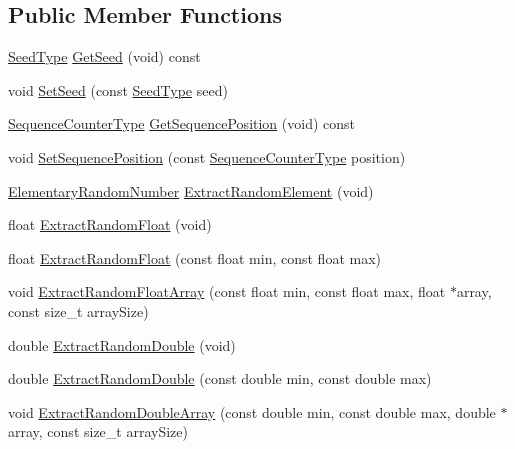 \subsection*{Public Member Functions}
\begin{DoxyCompactItemize}
\item 
\hyperlink{classcmn_random_sequence_a7b97009536ce38559fa5fb86a9eea16d}{Seed\-Type} \hyperlink{classcmn_random_sequence_a57fe316f0876245c29b59433e38b1c3f}{Get\-Seed} (void) const 
\item 
void \hyperlink{classcmn_random_sequence_a6a2a9b155aabad3f03084dd0118b7184}{Set\-Seed} (const \hyperlink{classcmn_random_sequence_a7b97009536ce38559fa5fb86a9eea16d}{Seed\-Type} seed)
\item 
\hyperlink{classcmn_random_sequence_ac3befd667513146020ef266429e205b0}{Sequence\-Counter\-Type} \hyperlink{classcmn_random_sequence_a929d0a120c7d031c0387098c2d2d6c4a}{Get\-Sequence\-Position} (void) const 
\item 
void \hyperlink{classcmn_random_sequence_aa3dacc3e54ded2e0b55e78e460f1bd0d}{Set\-Sequence\-Position} (const \hyperlink{classcmn_random_sequence_ac3befd667513146020ef266429e205b0}{Sequence\-Counter\-Type} position)
\item 
\hyperlink{classcmn_random_sequence_a4728645d25009df6b70fd0db6340f92f}{Elementary\-Random\-Number} \hyperlink{classcmn_random_sequence_ae86a1796c5a5fac599d61eb4a97e584d}{Extract\-Random\-Element} (void)
\item 
float \hyperlink{classcmn_random_sequence_a83458b2db657ac64588a2ccab6fea256}{Extract\-Random\-Float} (void)
\item 
float \hyperlink{classcmn_random_sequence_ac1c18ecbee3d9c31513167cd00b1619d}{Extract\-Random\-Float} (const float min, const float max)
\item 
void \hyperlink{classcmn_random_sequence_a0bfe5e8b2dfeb93e78eda34f3b445a55}{Extract\-Random\-Float\-Array} (const float min, const float max, float $\ast$array, const size\-\_\-t array\-Size)
\item 
double \hyperlink{classcmn_random_sequence_a86a8975706bba0f41e0d0a50327ba28d}{Extract\-Random\-Double} (void)
\item 
double \hyperlink{classcmn_random_sequence_a4a62c7f71d9bab73b58282c50ef5403d}{Extract\-Random\-Double} (const double min, const double max)
\item 
void \hyperlink{classcmn_random_sequence_a4135de38e09760cc8f3b901ac9580b50}{Extract\-Random\-Double\-Array} (const double min, const double max, double $\ast$array, const size\-\_\-t array\-Size)

\end{DoxyCompactItemize}
